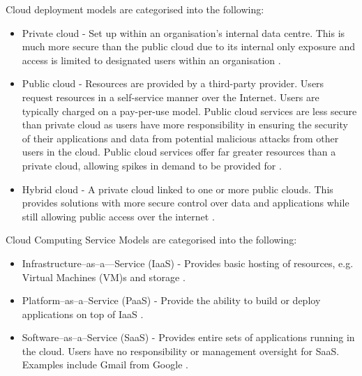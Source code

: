 Cloud deployment models are categorised into the following:
\begin{itemize}
\item Private cloud - Set up within an organisation's internal data centre. This is much more secure than the public cloud due to its internal only exposure and access is limited to designated users within an organisation \cite{2012CloudComputing}.
\item Public cloud - Resources are provided by a third-party provider. Users request resources in a self-service manner over the Internet. Users are typically charged on a pay-per-use model. Public cloud services are less secure than private cloud as users have more responsibility in ensuring the security of their applications and data from potential malicious attacks from other users in the cloud. Public cloud services offer far greater resources than a private cloud, allowing spikes in demand to be provided for  \cite{2012CloudComputing}.
\item Hybrid cloud - A private cloud linked to one or more public clouds. This provides solutions with more secure control over data and applications while still allowing public access over the internet \cite{2012CloudComputing}.
\end{itemize}

Cloud Computing Service Models are categorised into the following:
\begin{itemize}
	\item Infrastructure–as–a—Service (IaaS) - Provides basic hosting of resources, e.g. Virtual Machines (VM)s and storage \cite{2012CloudComputing}.
	\item Platform–as–a–Service (PaaS) - Provide the ability to build or deploy applications on top of IaaS \cite{2012CloudComputing}.
	\item Software–as–a–Service (SaaS) - Provides entire sets of applications running in the cloud. Users have no responsibility or management oversight for SaaS. Examples include Gmail from Google \cite{2012CloudComputing}.	
\end{itemize}


